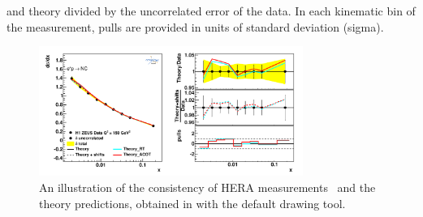 \begin{description}
and theory divided by the uncorrelated error of the data. 
In each kinematic bin of the measurement, pulls are provided in units of standard deviation (sigma).  
\begin{figure}[!ht]
   \centering
   \includegraphics[width=8.6cm]{datatheory.pdf}
   \caption{An illustration of the consistency of HERA measurements~\cite{h1zeus:2009wt} and the theory predictions, 
       obtained in \fitter with the default drawing tool.} 
 \label{fig:data}
\end{figure}

\end{description}
%


